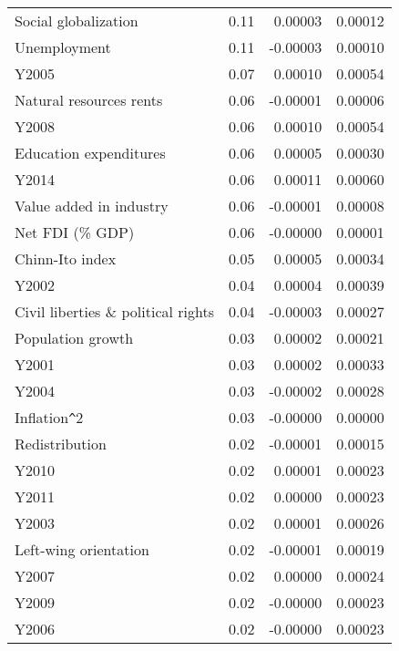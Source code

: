 \documentclass[a4paper,11pt]{article}
\begin{document}
\begin{table}[!ht]
\begin{tabular}{lrrr}
  Social globalization & 0.11 & 0.00003 & 0.00012 \\ 
  Unemployment & 0.11 & -0.00003 & 0.00010 \\
  Y2005 & 0.07 & 0.00010 & 0.00054 \\
  Natural resources rents & 0.06 & -0.00001 & 0.00006 \\
  Y2008 & 0.06 & 0.00010 & 0.00054 \\
  Education expenditures & 0.06 & 0.00005 & 0.00030 \\ 
  Y2014 & 0.06 & 0.00011 & 0.00060 \\ 
  Value added in industry & 0.06 & -0.00001 & 0.00008 \\
  Net FDI (\% GDP) & 0.06 & -0.00000 & 0.00001 \\
  Chinn-Ito index & 0.05 & 0.00005 & 0.00034 \\ 
  Y2002 & 0.04 & 0.00004 & 0.00039 \\
  Civil liberties \& political rights & 0.04 & -0.00003 & 0.00027 \\ 
  Population growth & 0.03 & 0.00002 & 0.00021 \\ 
  Y2001 & 0.03 & 0.00002 & 0.00033 \\ 
  Y2004 & 0.03 & -0.00002 & 0.00028 \\ 
  Inflation\verb|^|2 & 0.03 & -0.00000 & 0.00000 \\ 
  Redistribution & 0.02 & -0.00001 & 0.00015 \\ 
  Y2010 & 0.02 & 0.00001 & 0.00023 \\ 
  Y2011 & 0.02 & 0.00000 & 0.00023 \\ 
  Y2003 & 0.02 & 0.00001 & 0.00026 \\ 
  Left-wing orientation & 0.02 & -0.00001 & 0.00019 \\
  Y2007 & 0.02 & 0.00000 & 0.00024 \\ 
  Y2009 & 0.02 & -0.00000 & 0.00023 \\
  Y2006 & 0.02 & -0.00000 & 0.00023 \\
    \end{tabular}
    \end{table}
\end{document}
